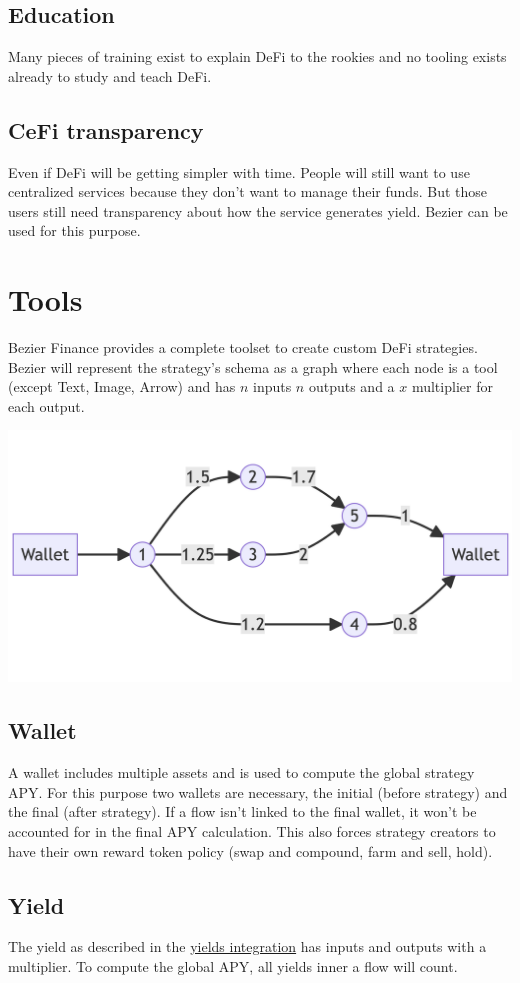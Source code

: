 \documentclass{article}
\begin{document}
\subsection{Education}
Many pieces of training exist to explain DeFi to the rookies and no tooling exists already to study and teach DeFi.
\subsection{CeFi transparency}
Even if DeFi will be getting simpler with time. People will still want to use centralized services because they don't want to manage their funds. But those users still need transparency about how the service generates yield. Bezier can be used for this purpose. 
\section{Tools}
Bezier Finance provides a complete toolset to create custom DeFi strategies. Bezier will represent the strategy's schema as a graph where each node is a tool (except Text, Image, Arrow) and has $n$ inputs $n$ outputs and a $x$ multiplier for each output.
\begin{center}
    \includegraphics[scale=0.2]{graph.png}
\end{center}
\subsection{Wallet}
A wallet includes multiple assets and is used to compute the global strategy APY. For this purpose two wallets are necessary, the initial (before strategy) and the final (after strategy). If a flow isn't linked to the final wallet, it won't be accounted for in the final APY calculation. This also forces strategy creators to have their own reward token policy (swap and compound, farm and sell, hold).
\subsection{Yield}
The yield as described in the \hyperref[sec:integration__yield]{yields integration} has inputs and outputs with a multiplier. To compute the global APY, all yields inner a flow will count.
\end{document}
